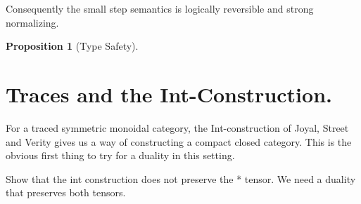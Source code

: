 \documentclass[preprint]{sigplanconf}
\newcommand{\xcomment}[2]{\textbf{#1:~\textsl{#2}}}
\newcommand{\roshan}[1]{\xcomment{Roshan}{#1}}
\newtheorem{proposition}[theorem]{Proposition}
\begin{document}
Consequently the small step semantics is logically reversible and
strong normalizing. 

\begin{proposition}[Type Safety]
  
\end{proposition}






\section{Traces and the Int-Construction.}

For a traced symmetric monoidal category, the Int-construction of
Joyal, Street and Verity \cite{joyal1996traced} gives us a way of
constructing a compact closed category. This is the obvious first
thing to try for a duality in this setting.



Show that the int construction does not preserve the {{*}} tensor. We
need a duality that preserves both tensors.
\end{document}
